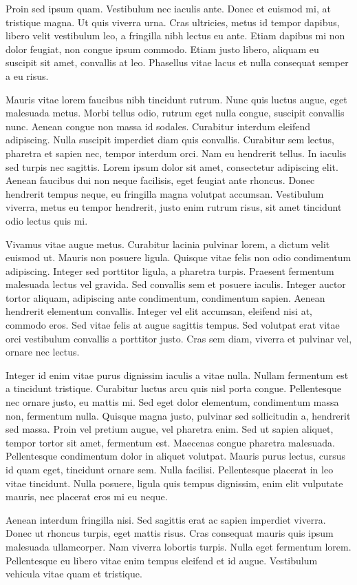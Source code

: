 \documentclass[]{article}
\begin{document}
Proin sed ipsum quam. Vestibulum nec iaculis ante. Donec et euismod mi, at tristique magna. Ut quis viverra urna. Cras ultricies, metus id tempor dapibus, libero velit vestibulum leo, a fringilla nibh lectus eu ante. Etiam dapibus mi non dolor feugiat, non congue ipsum commodo. Etiam justo libero, aliquam eu suscipit sit amet, convallis at leo. Phasellus vitae lacus et nulla consequat semper a eu risus.

Mauris vitae lorem faucibus nibh tincidunt rutrum. Nunc quis luctus augue, eget malesuada metus. Morbi tellus odio, rutrum eget nulla congue, suscipit convallis nunc. Aenean congue non massa id sodales. Curabitur interdum eleifend adipiscing. Nulla suscipit imperdiet diam quis convallis. Curabitur sem lectus, pharetra et sapien nec, tempor interdum orci. Nam eu hendrerit tellus. In iaculis sed turpis nec sagittis. Lorem ipsum dolor sit amet, consectetur adipiscing elit. Aenean faucibus dui non neque facilisis, eget feugiat ante rhoncus. Donec hendrerit tempus neque, eu fringilla magna volutpat accumsan. Vestibulum viverra, metus eu tempor hendrerit, justo enim rutrum risus, sit amet tincidunt odio lectus quis mi.

Vivamus vitae augue metus. Curabitur lacinia pulvinar lorem, a dictum velit euismod ut. Mauris non posuere ligula. Quisque vitae felis non odio condimentum adipiscing. Integer sed porttitor ligula, a pharetra turpis. Praesent fermentum malesuada lectus vel gravida. Sed convallis sem et posuere iaculis. Integer auctor tortor aliquam, adipiscing ante condimentum, condimentum sapien. Aenean hendrerit elementum convallis. Integer vel elit accumsan, eleifend nisi at, commodo eros. Sed vitae felis at augue sagittis tempus. Sed volutpat erat vitae orci vestibulum convallis a porttitor justo. Cras sem diam, viverra et pulvinar vel, ornare nec lectus.

Integer id enim vitae purus dignissim iaculis a vitae nulla. Nullam fermentum est a tincidunt tristique. Curabitur luctus arcu quis nisl porta congue. Pellentesque nec ornare justo, eu mattis mi. Sed eget dolor elementum, condimentum massa non, fermentum nulla. Quisque magna justo, pulvinar sed sollicitudin a, hendrerit sed massa. Proin vel pretium augue, vel pharetra enim. Sed ut sapien aliquet, tempor tortor sit amet, fermentum est. Maecenas congue pharetra malesuada. Pellentesque condimentum dolor in aliquet volutpat. Mauris purus lectus, cursus id quam eget, tincidunt ornare sem. Nulla facilisi. Pellentesque placerat in leo vitae tincidunt. Nulla posuere, ligula quis tempus dignissim, enim elit vulputate mauris, nec placerat eros mi eu neque.

Aenean interdum fringilla nisi. Sed sagittis erat ac sapien imperdiet viverra. Donec ut rhoncus turpis, eget mattis risus. Cras consequat mauris quis ipsum malesuada ullamcorper. Nam viverra lobortis turpis. Nulla eget fermentum lorem. Pellentesque eu libero vitae enim tempus eleifend et id augue. Vestibulum vehicula vitae quam et tristique.

\endnumbering
\end{document}

